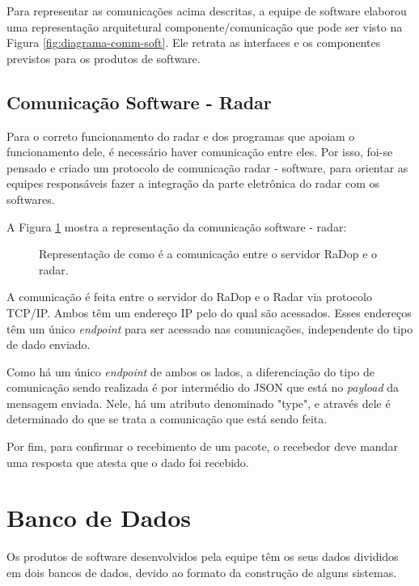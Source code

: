 Para representar as comunicações acima descritas, a equipe de software elaborou uma representação arquitetural componente/comunicação que pode ser visto na Figura \ref{fig:diagrama-comm-soft}. Ele retrata as interfaces e os componentes previstos para os produtos de software.

\subsection{Comunicação Software - Radar}

Para o correto funcionamento do radar e dos programas que apoiam o funcionamento dele, é necessário haver comunicação entre eles. Por isso, foi-se pensado e criado um protocolo de comunicação radar - software, para orientar as equipes responsáveis fazer a integração da parte eletrônica do radar com os softwares.

A Figura \ref{fig:diagrama-com-soft-radar} mostra a representação da comunicação software - radar:

\begin{figure}[H]
	\caption{\label{fig:diagrama-com-soft-radar} Representação de como é a comunicação entre o servidor RaDop e o radar.}
\end{figure}

A comunicação é feita entre o servidor do RaDop e o Radar via protocolo TCP/IP. Ambos têm um endereço IP pelo do qual são acessados. Esses endereços têm um único \textit{endpoint} para ser acessado nas comunicações, independente do tipo de dado enviado.

Como há um único \textit{endpoint} de ambos os lados, a diferenciação do tipo de comunicação sendo realizada é por intermédio do JSON que está no \textit{payload} da mensagem enviada. Nele, há um atributo denominado "type", e através dele é determinado do que se trata a comunicação que está sendo feita.

Por fim, para confirmar o recebimento de um pacote, o recebedor deve mandar uma resposta que atesta que o dado foi recebido.

\section{Banco de Dados}

Os produtos de software desenvolvidos pela equipe têm os seus dados divididos em dois bancos de dados, devido ao formato da construção de alguns sistemas.

